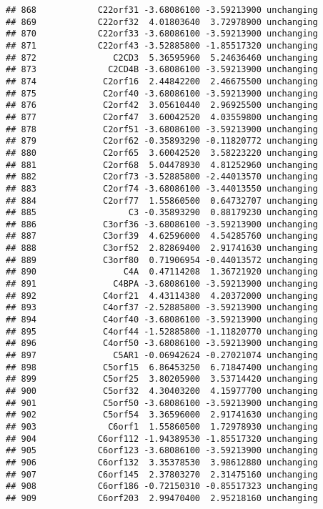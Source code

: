 \documentclass[]{article}
\begin{document}
\begin{verbatim}
## 868            C22orf31 -3.68086100 -3.59213900 unchanging
## 869            C22orf32  4.01803640  3.72978900 unchanging
## 870            C22orf33 -3.68086100 -3.59213900 unchanging
## 871            C22orf43 -3.52885800 -1.85517320 unchanging
## 872               C2CD3  5.36595960  5.24636460 unchanging
## 873              C2CD4B -3.68086100 -3.59213900 unchanging
## 874             C2orf16  2.44842200  2.46675500 unchanging
## 875             C2orf40 -3.68086100 -3.59213900 unchanging
## 876             C2orf42  3.05610440  2.96925500 unchanging
## 877             C2orf47  3.60042520  4.03559800 unchanging
## 878             C2orf51 -3.68086100 -3.59213900 unchanging
## 879             C2orf62 -0.35893290 -0.11820772 unchanging
## 880             C2orf65  3.60042520  3.58223220 unchanging
## 881             C2orf68  5.04478930  4.81252960 unchanging
## 882             C2orf73 -3.52885800 -2.44013570 unchanging
## 883             C2orf74 -3.68086100 -3.44013550 unchanging
## 884             C2orf77  1.55860500  0.64732707 unchanging
## 885                  C3 -0.35893290  0.88179230 unchanging
## 886             C3orf36 -3.68086100 -3.59213900 unchanging
## 887             C3orf39  4.62596000  4.54285760 unchanging
## 888             C3orf52  2.82869400  2.91741630 unchanging
## 889             C3orf80  0.71906954 -0.44013572 unchanging
## 890                 C4A  0.47114208  1.36721920 unchanging
## 891               C4BPA -3.68086100 -3.59213900 unchanging
## 892             C4orf21  4.43114380  4.20372000 unchanging
## 893             C4orf37 -2.52885800 -3.59213900 unchanging
## 894             C4orf40 -3.68086100 -3.59213900 unchanging
## 895             C4orf44 -1.52885800 -1.11820770 unchanging
## 896             C4orf50 -3.68086100 -3.59213900 unchanging
## 897               C5AR1 -0.06942624 -0.27021074 unchanging
## 898             C5orf15  6.86453250  6.71847400 unchanging
## 899             C5orf25  3.80205900  3.53714420 unchanging
## 900             C5orf32  4.30403200  4.15977700 unchanging
## 901             C5orf50 -3.68086100 -3.59213900 unchanging
## 902             C5orf54  3.36596000  2.91741630 unchanging
## 903              C6orf1  1.55860500  1.72978930 unchanging
## 904            C6orf112 -1.94389530 -1.85517320 unchanging
## 905            C6orf123 -3.68086100 -3.59213900 unchanging
## 906            C6orf132  3.35378530  3.98612880 unchanging
## 907            C6orf145  2.37803270  2.31475160 unchanging
## 908            C6orf186 -0.72150310 -0.85517323 unchanging
## 909            C6orf203  2.99470400  2.95218160 unchanging

\end{verbatim}
\end{document}
